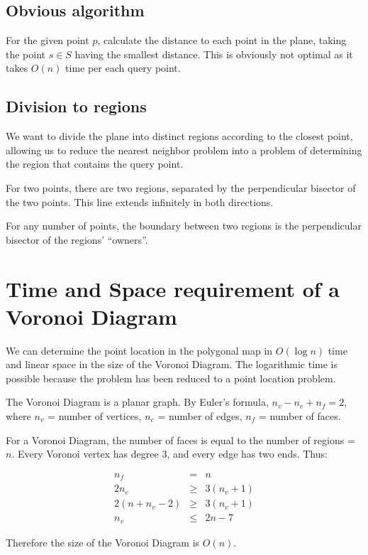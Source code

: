 \documentclass{article}
\begin{document}
\subsection{Obvious algorithm}
For the given point $p$, calculate the distance to each point in the plane, taking the point $s \in S$ having the smallest distance. This is obviously not optimal as it takes $O(n)$ time per each query point.

\subsection{Division to regions}
We want to divide the plane into distinct regions according to the closest point,  allowing us to reduce the nearest neighbor problem into a problem of determining the region that contains the query point.

For two points, there are two regions, separated by the perpendicular bisector of the two points. This line extends infinitely in both directions.

For any number of points, the boundary between two regions is the perpendicular bisector of the regions' ``owners''.

\section{Time and Space requirement of a Voronoi Diagram}
We can determine the point location in the polygonal map in $O(\log n)$ time
and linear space in the size of the Voronoi Diagram. The logarithmic time is possible because the problem has been reduced to a point location problem.

The Voronoi Diagram is a planar graph. By Euler's formula, $n_v - n_e + n_f =
2$, where $n_v$ = number of vertices, $n_e$ = number of edges, $n_f$ = number of
faces.

For a Voronoi Diagram, the number of faces is equal to the number of
regions = $n$. Every Voronoi vertex has degree 3, and every edge has
two ends. Thus:

\begin{eqnarray}
n_f &=& n\nonumber\\
2 n_e &\geq& 3 (n_v + 1)\nonumber\\
2 (n + n_v - 2) &\geq& 3 (n_v + 1)\nonumber\\
n_v &\leq&  2  n - 7\nonumber
\end{eqnarray}

Therefore the size of the Voronoi Diagram is $O(n)$.
\end{document}
